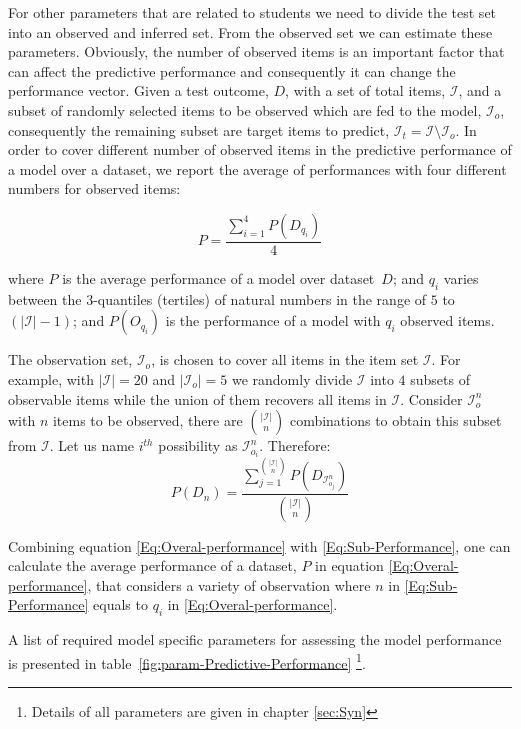 For other parameters that are related to students we need to divide the test set into an observed and inferred set. From the observed set we can estimate these parameters. Obviously, the number of observed items is an important factor that can affect the predictive performance and consequently it can change the performance vector. Given a test outcome, $D$, with a set of total items, $\mathcal{I}$, and a subset of randomly selected items to be observed which are fed to the model, $\mathcal{I}_o$, consequently the remaining subset are target items to predict, $\mathcal{I}_t = \mathcal{I}\setminus\mathcal{I}_o$. In order to cover different number of observed items in the predictive performance of a model over a dataset, we report the average of performances with four different numbers for observed items:

\begin{equation}
P = \frac{\sum_{i = 1}^{4}{P(D_{q_i})}}{4}
\label{Eq:Overal-performance}
\end{equation} 

 where $P$ is the average performance of a model over dataset~$D$; and $q_i$ varies between the 3-quantiles (tertiles) of natural numbers in the range of $5$ to $(|\mathcal{I}|-1)$; and $P(O_{q_i})$ is the performance of a model with $q_i$ observed items.

The observation set, $\mathcal{I}_o$, is chosen to cover all items in the item set $\mathcal{I}$. For example, with $|\mathcal{I}| = 20$ and $|\mathcal{I}_o| = 5$ we randomly divide $\mathcal{I}$ into $4$ subsets of observable items while the union of them recovers all items in $\mathcal{I}$. Consider $\mathcal{I}_o^n$ with $n$ items to be observed, there are ${|\mathcal{I}|\choose n}$ combinations to obtain this subset from $\mathcal{I}$. Let us name $i^{th}$ possibility as $\mathcal{I}_{o_i}^n$. Therefore:
\begin{equation}
P(D_n) = \frac{\sum_{j = 1}^{|\mathcal{I}|\choose n}{P(D_{\mathcal{I}_{o_j}^n})}}{{|\mathcal{I}|\choose n}}
\label{Eq:Sub-Performance}
\end{equation}

Combining equation \ref{Eq:Overal-performance} with \ref{Eq:Sub-Performance}, one can calculate the average performance of a dataset, $P$ in equation \ref{Eq:Overal-performance}, that considers a variety of observation where $n$ in \ref{Eq:Sub-Performance} equals to $q_i$ in \ref{Eq:Overal-performance}.

A list of required model specific parameters for assessing the model performance is presented in table~\ref{fig:param-Predictive-Performance} \footnote{Details of all parameters are given in chapter \ref{sec:Syn}}.

